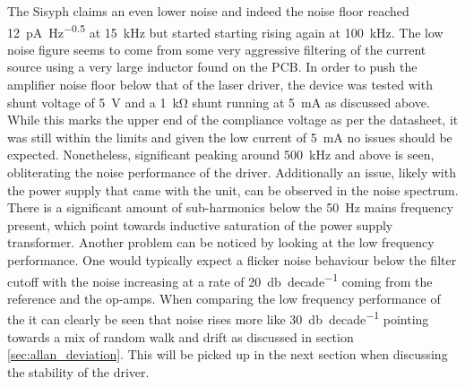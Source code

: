 The Sisyph  claims an even lower noise and indeed the noise floor reached \qty{12}{\pA \per \Hz\tothe{0.5}} at \qty{15}{\kHz} but started starting rising again at \qty{100}{\kHz}. The low noise figure seems to come from some very aggressive filtering of the current source using a very large inductor found on the PCB. In order to push the amplifier noise floor below that of the laser driver, the device was tested with shunt voltage of \qty{5}{\V} and a \qty{1}{\kilo\ohm} shunt running at \qty{5}{\mA} as discussed above. While this marks the upper end of the compliance voltage as per the datasheet, it was still within the limits and given the low current of \qty{5}{\mA} no issues should be expected. Nonetheless, significant peaking around \qty{500}{\kHz} and above is seen, obliterating the noise performance of the driver. Additionally an issue, likely with the power supply that came with the unit, can be observed in the noise spectrum. There is a significant amount of sub-harmonics below the \qty{50}{\Hz} mains frequency present, which point towards inductive saturation of the power supply transformer. Another problem can be noticed by looking at the low frequency performance. One would typically expect a flicker noise behaviour below the filter cutoff with the noise increasing at a rate of \qty{20}{\decibel \per decade} coming from the reference and the op-amps. When comparing the low frequency performance of the  it can clearly be seen that noise rises more like \qty{30}{\decibel \per decade} pointing towards a mix of random walk and drift as discussed in section \ref{sec:allan_deviation}. This will be picked up in the next section when discussing the stability of the driver.

